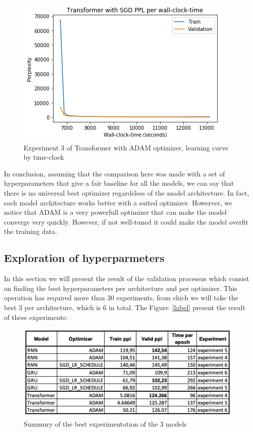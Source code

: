 \begin{itemize}
\begin{figure}[H]
	\centering
	\includegraphics[scale=0.8]{Q4-2_TR_SGD_clock.png}
	\caption{Experiment 3 of Transformer with ADAM optimizer, learning curve by time-clock}
	\label{fig:fig18}
\end{figure}

\end{itemize}
%
In conclusion, assuming that the comparison here was made with a set of hyperparameters that give a fair baseline for all the models, we can say that there is no universal best optimizer regardeless of the model architecture. In fact, each model architecture works better with a suited optimizer. Howerver, we notice that ADAM is a very powerfull optimizer that can make the model converge very quickly. However, if not well-tuned it could make the model overfit the training data. \\



\subsection{Exploration of hyperparmeters}

In this section we will present the result of the validation processus which consist on finding the best hyperparameters per architecture and per optimizer. This operation has required more than 30 experiments, from chich we will take the best 3 per architecture, which is 6 in total. The Figure~\ref{label} present the result of these experiments:

\begin{figure}[H]
	\centering
	\includegraphics[scale=0.6]{Q4-3_Summury.png}
	\caption{Summury of the best experimentation of the 3 models}
	\label{fig:fig19}
\end{figure}

